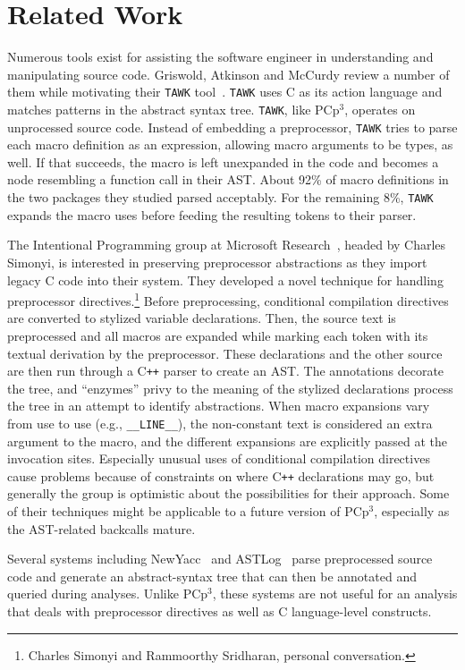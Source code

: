 \documentclass{article}
\newcommand{\pcp}{\mbox{\textsf{PCp}$^3$}}
\newcommand{\CPP}{\mbox{C\texttt{++}}}
\newcommand{\C}{\mbox{C}}
\newcommand{\eg}{e.g.,}
\begin{document}
\section*{Related Work}
\label{sec:related}
Numerous tools exist for assisting the software engineer in
understanding and manipulating source code.  Griswold, Atkinson and McCurdy
review a number of them while motivating their \texttt{TAWK}
tool~\cite{Griswold96}.  \texttt{TAWK} uses \C{} as its action language
and matches patterns in the abstract syntax tree.  \texttt{TAWK}, like
\pcp{}, operates on unprocessed source code.  Instead of embedding a
preprocessor, \texttt{TAWK} tries to parse each macro definition as an
expression, allowing macro arguments to be types, as well.  If that
succeeds, the macro is left unexpanded in the code and becomes a node
resembling a function call in their AST.  About 92\% of macro
definitions in the two packages they studied parsed acceptably.  For the
remaining 8\%, \texttt{TAWK} expands the macro uses before feeding the resulting tokens to
their parser.

The Intentional Programming group at Microsoft
Research~\cite{Simonyi96}, headed by Charles Simonyi, is interested in
preserving preprocessor abstractions as they import legacy \C{} code
into their system.  They developed a novel technique for handling
preprocessor directives.\footnote{Charles Simonyi and Rammoorthy
  Sridharan, personal conversation.}  Before preprocessing, conditional
compilation directives are converted to stylized variable declarations.
Then, the source text is preprocessed and all macros are expanded while
marking each token with its textual derivation by the preprocessor.
These declarations and the other source are then run through a \CPP{}
parser to create an AST.  The annotations decorate the tree, and
``enzymes'' privy to the meaning of the stylized declarations process
the tree in an attempt to identify abstractions.  When macro expansions
vary from use to use (\eg{} \texttt{\_\_LINE\_\_}), the non-constant
text is considered an extra argument to the macro, and the different
expansions are explicitly passed at the invocation sites. Especially
unusual uses of conditional compilation directives cause problems
because of constraints on where \CPP{} declarations may go, but
generally the group is optimistic about the possibilities for their
approach.  Some of their techniques might be applicable to a future
version of \pcp{}, especially as the AST-related backcalls mature.

Several systems including NewYacc~\cite{Purtilo89} and
ASTLog~\cite{Crew97} parse preprocessed source code and generate an
abstract-syntax tree that can then be annotated and queried during
analyses.  Unlike \pcp{}, these systems are not useful for an analysis
that deals with preprocessor directives as well as \C{} language-level
constructs.
\end{document}
